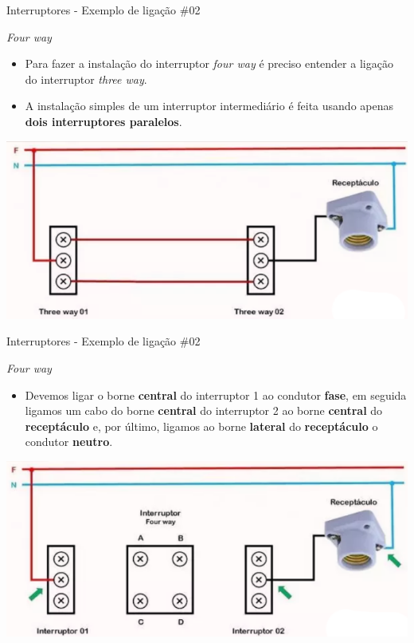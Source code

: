 \begin{frame}{Interruptores - Exemplo de ligação \#02}
	\begin{block}{\textit{Four way}}
		\begin{itemize}
			\item Para fazer a instalação do interruptor \textit{four way} é preciso entender a ligação do interruptor \textit{three way}.
			\item A instalação simples de um interruptor intermediário é feita usando apenas \textbf{dois interruptores paralelos}.
		\end{itemize}
	\end{block}

	\bigskip

	\centering
	\includegraphics[width=0.8\linewidth]{Figuras/Ch08/fig22}
\end{frame}


\begin{frame}{Interruptores - Exemplo de ligação \#02}
	\begin{block}{\textit{Four way}}
		\begin{itemize}
			\item Devemos ligar o borne \textbf{central} do interruptor 1 ao condutor \textbf{fase}, em seguida ligamos um cabo do borne \textbf{central} do interruptor 2 ao borne \textbf{central} do \textbf{receptáculo} e, por último, ligamos ao borne \textbf{lateral} do \textbf{receptáculo} o condutor \textbf{neutro}.
		\end{itemize}
	\end{block}

	\bigskip

	\centering
	\includegraphics[width=0.8\linewidth]{Figuras/Ch08/fig23}
\end{frame}


